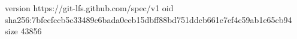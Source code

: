 version https://git-lfs.github.com/spec/v1
oid sha256:7bfecfccb5c33489c6bada0eeb15dbff88bd751ddcb661e7ef4c59ab1e65cb94
size 43856
